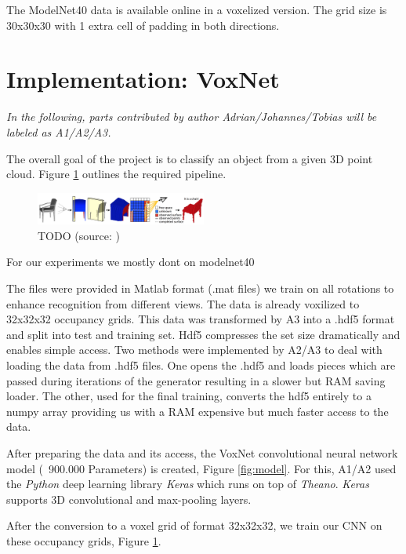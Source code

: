 \documentclass[10pt,twocolumn,letterpaper]{article}
\begin{document}
The ModelNet40 data is available online in a voxelized version.  The grid size is 30x30x30 with 1 extra cell of padding in both directions.

\section{Implementation: VoxNet \cite{voxnet}}

\textit{In the following, parts contributed by author Adrian/Johannes/Tobias will be labeled 
as A1/A2/A3.}\newline

The overall goal of the project is to classify an object from a given 3D point cloud. Figure \ref{fig:algo} outlines 
the required pipeline.

\begin{figure}[h]
	\label{fig:algo}
	\centering
	\includegraphics[width=0.5\textwidth]{figures/algo}
	\caption{ TODO (source: \cite{shape})}
\end{figure}

For our experiments we mostly dont on modelnet40

The files were provided in Matlab format (.mat files)
we train on all rotations to enhance recognition from 
different views. The data is already voxilized to 32x32x32 occupancy grids.
This data was transformed by A3 into a .hdf5 format and split into test and training set. 
Hdf5 compresses the set size dramatically and enables simple access.
Two methods were implemented by A2/A3 to deal with loading the data from .hdf5 files. 
One opens the .hdf5 and loads pieces which are passed during iterations of the generator resulting 
in a slower but RAM saving loader. The other, used for the final training, converts the hdf5 entirely to a numpy array 
providing us with a RAM expensive but much faster access to the data.

After preparing the data and its access, the VoxNet convolutional neural network model (~900.000 Parameters) is created, 
Figure \ref{fig:model}. For this, A1/A2 used the \textit{Python} deep learning library \textit{Keras} which runs on top of \textit{Theano}. 
\textit{Keras} supports 3D convolutional and max-pooling layers. 

After the conversion to a voxel grid of format 32x32x32, we train our CNN on these occupancy grids, Figure \ref{fig:algo}.
\end{document}
